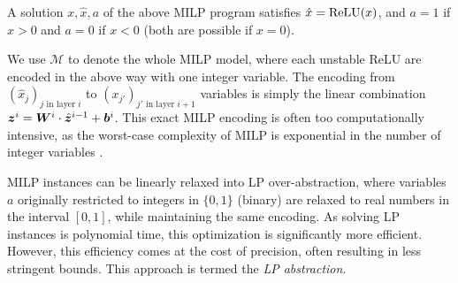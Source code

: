 \begin{proposition}
\cite{MILP}
\label{Prop1}
A solution $x,\hat{x},a$  of the above MILP program satisfies $\hat{x} = \mathrm{ReLU}(x)$,
and $a=1$ if $x> 0$ and $a=0$ if $x< 0$ (both are possible if $x=0$).
\end{proposition}

	
    \iffalse
	The global structure is as follows, using Gurobi as an example:
	\begin{enumerate}
		\item For each input node, each output node, and each pre-activation and post-activation node in the hidden layers,  set one variable. 
		\item Set constraints for input nodes.
		\item For each pre-activation node in a hidden layer (and each output node), set linear constraints relating them to the post-activation or input nodes in the previous layer they connect to.
		\item Between pre- and post- activation nodes, set the MILP constraint described above.
	\end{enumerate} 
    
    \fi
    
    We use $\mathcal{M}$ to denote the whole MILP model, where each unstable ReLU are encoded in the above way with one integer variable. 
	The encoding from $(\hat{x}_j)_{j \text{ in layer } i}$ to 
	$(x_{j'})_{j' \text{ in layer } i+1}$ variables is simply the linear combination 
	$\boldsymbol{z}^{i} = \boldsymbol{W}^i\cdot \hat{\boldsymbol{z}}^{i-1}+ {\bm{b}}^i$.
	This exact MILP encoding is often too computationally intensive, as the worst-case complexity of MILP is exponential in the number of integer variables \cite{DivideAndSlide}.
    
    
	MILP instances can be linearly relaxed into LP over-abstraction, where variables $a$ originally restricted to integers in $\{0,1\}$ (binary) are relaxed to real numbers in the interval $[0,1]$, while maintaining the same encoding. As solving LP instances is polynomial time, this optimization is significantly more efficient. However, this efficiency comes at the cost of precision, often resulting in less stringent bounds. This approach is termed the {\em LP abstraction}.
	
